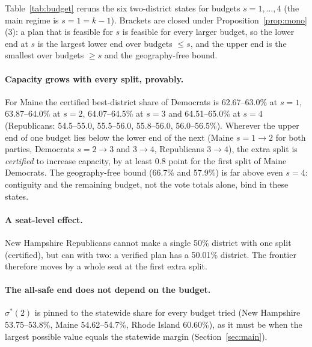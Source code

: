 Table~\ref{tab:budget} reruns the six two-district states for budgets $s=1,\dots,4$ (the main regime is $s=1=k-1$). Brackets are closed under Proposition~\ref{prop:mono}(3): a plan that is feasible for $s$ is feasible for every larger budget, so the lower end at $s$ is the largest lower end over budgets $\le s$, and the upper end is the smallest over budgets $\ge s$ and the geography-free bound.

\begin{table}[!tbp]
\centering\small
\caption{Best-district ($q=1$) and second-best ($q=2$) share, in percent of the two-party vote, as the county-split budget $s$ grows ($\pm1\%$, 2020 presidential vote); geography-free hull bound and unconstrained ReCom incumbent for comparison. ``$<$50'': no plan of the regime has $q$ districts at 50\% or more.}\label{tab:budget}
\end{table}

\paragraph{Capacity grows with every split, provably.}
For Maine the certified best-district share of Democrats is 62.67--63.0\% at $s=1$, 63.87--64.0\% at $s=2$, 64.07--64.5\% at $s=3$ and 64.51--65.0\% at $s=4$ (Republicans: 54.5--55.0, 55.5--56.0, 55.8--56.0, 56.0--56.5\%). Wherever the upper end of one budget lies below the lower end of the next (Maine $s=1\to2$ for both parties, Democrats $s=2\to3$ and $3\to4$, Republicans $3\to4$), the extra split is \emph{certified} to increase capacity, by at least 0.8 point for the first split of Maine Democrats. The geography-free bound (66.7\% and 57.9\%) is far above even $s=4$: contiguity and the remaining budget, not the vote totals alone, bind in these states.

\paragraph{A seat-level effect.}
New Hampshire Republicans cannot make a single 50\% district with one split (certified), but can with two: a verified plan has a 50.01\% district. The frontier therefore moves by a whole seat at the first extra split.

\paragraph{The all-safe end does not depend on the budget.}
$\sigma^*(2)$ is pinned to the statewide share for every budget tried (New Hampshire 53.75--53.8\%, Maine 54.62--54.7\%, Rhode Island 60.60\%), as it must be when the largest possible value equals the statewide margin (Section~\ref{sec:main}).

